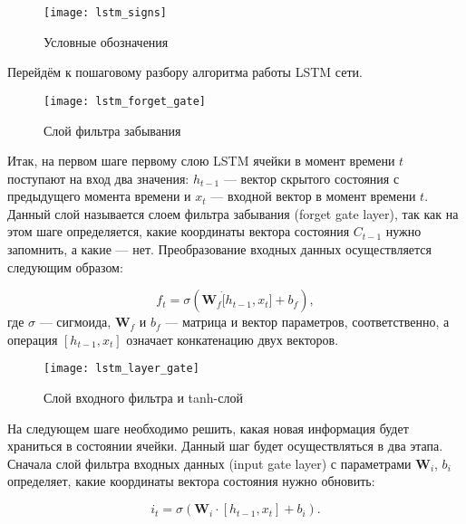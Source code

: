 \documentclass[specialist,
               substylefile = spbu.rtx,
               subf, 
               colorlinks=true, 12pt]{disser}
\begin{document}
\begin{figure}[!h]
\begin{center}
\texttt{[image: lstm\_signs]}
\end{center}
\caption{Условные обозначения}
\end{figure}


Перейдём к пошаговому разбору алгоритма работы LSTM сети.

\begin{figure}[!h]
\begin{center}
\texttt{[image: lstm\_forget\_gate]}
\end{center}
\caption{Слой фильтра забывания}
\end{figure}


Итак, на первом шаге первому слою LSTM ячейки в момент времени $t$ поступают на вход два значения: $h_{t-1}$ --- вектор скрытого состояния с предыдущего момента времени и $x_t$ --- входной вектор в момент времени $t$. Данный слой называется слоем фильтра забывания (forget gate layer), так как на этом шаге определяется, какие координаты вектора состояния $C_{t-1}$ нужно запомнить, а какие --- нет. Преобразование входных данных осуществляется следующим образом:

\begin{equation}
f_t = \sigma(\mathbf{W}_f \dot [h_{t-1},x_t] + b_f),
\label{eq:f_t}
\end{equation}
где $\sigma$ --- сигмоида, $\mathbf{W}_f$ и $b_f$ --- матрица и вектор параметров, соответственно, а операция $ [h_{t-1},x_t]$ означает конкатенацию двух векторов. 

\begin{figure}[!h]
\begin{center}
\texttt{[image: lstm\_layer\_gate]}
\end{center}
\caption{Слой входного фильтра и tanh-слой}
\end{figure}


На следующем шаге необходимо решить, какая новая информация будет храниться в состоянии ячейки. Данный шаг будет осуществляться в два этапа. Сначала слой фильтра входных данных (input gate layer) с параметрами $\mathbf{W}_i$, $b_i$ определяет, какие координаты вектора состояния нужно обновить:

\begin{equation}
i_t = \sigma(\mathbf{W}_i \cdot [h_{t-1},x_t] + b_i).
\label{eq:i_t}
\end{equation}
\end{document}
